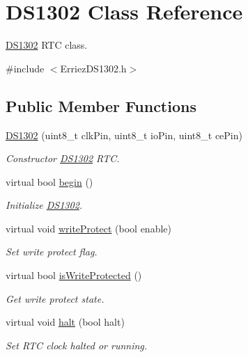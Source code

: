 \hypertarget{class_d_s1302}{}\section{D\+S1302 Class Reference}
\label{class_d_s1302}


\hyperlink{class_d_s1302}{D\+S1302} R\+TC class.  




{\ttfamily \#include $<$Erriez\+D\+S1302.\+h$>$}

\subsection*{Public Member Functions}
\begin{DoxyCompactItemize}
\item 
\hyperlink{class_d_s1302_ae7f11fc2a6a8333df47be5f8996729e7}{D\+S1302} (uint8\+\_\+t clk\+Pin, uint8\+\_\+t io\+Pin, uint8\+\_\+t ce\+Pin)
\begin{DoxyCompactList}\small\item\em Constructor \hyperlink{class_d_s1302}{D\+S1302} R\+TC. \end{DoxyCompactList}\item 
virtual bool \hyperlink{class_d_s1302_a2a224cc4638a850a7ef7af6385d22817}{begin} ()
\begin{DoxyCompactList}\small\item\em Initialize \hyperlink{class_d_s1302}{D\+S1302}. \end{DoxyCompactList}\item 
virtual void \hyperlink{class_d_s1302_abb5fdad141ff792fa2d0edb308b83903}{write\+Protect} (bool enable)
\begin{DoxyCompactList}\small\item\em Set write protect flag. \end{DoxyCompactList}\item 
virtual bool \hyperlink{class_d_s1302_a72edd217b42eb23576e6d63c8a560f17}{is\+Write\+Protected} ()
\begin{DoxyCompactList}\small\item\em Get write protect state. \end{DoxyCompactList}\item 
virtual void \hyperlink{class_d_s1302_a7d397e8c06e3f11c0b975c4157a14bdf}{halt} (bool halt)
\begin{DoxyCompactList}\small\item\em Set R\+TC clock halted or running. \end{DoxyCompactList}\item 

\end{DoxyCompactItemize}
